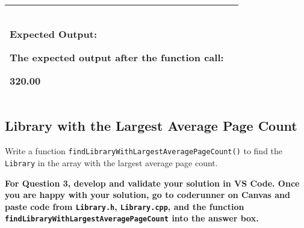 \begin{longtable}{|p{1.7in}|p{4.3in}|}
\begin{example}
\begin{verbatim}
\end{verbatim}
\end{example}


\textbf{Expected Output:} 

\vspace{5pt}
The expected output after the function call:

320.00

\\ \hline

\end{longtable}


\newpage
\subsection{Library with the Largest Average Page Count}

Write a function \texttt{findLibraryWithLargestAveragePageCount()} to find the \texttt{Library} in the array with the largest average page count.

\vspace{5pt}

\textbf{For Question 3, develop and validate your solution in VS Code. Once you are happy with your solution, go to coderunner on Canvas and paste code from \texttt{Library.h}, \texttt{Library.cpp}, and the function \texttt{findLibraryWithLargestAveragePageCount} into the answer box.} 

